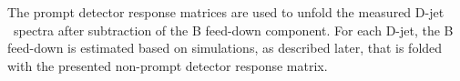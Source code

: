 The prompt detector response matrices are used to unfold the measured D-jet \pt\ spectra after subtraction of the B feed-down component. 
For each D-jet, the B feed-down is estimated based on simulations, as described later, that is folded with the presented non-prompt detector response matrix.
%
%
%
%
%
%
%



